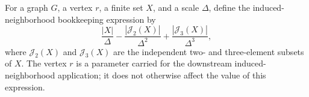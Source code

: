 \begin{definition}
For a graph $G$, a vertex $r$, a finite set $X$, and a scale $\Delta$, define
the induced-neighborhood bookkeeping expression by
\[
\frac{|X|}{\Delta}
-\frac{|\mathcal J_2(X)|}{\Delta^2}
+\frac{|\mathcal J_3(X)|}{\Delta^3},
\]
where $\mathcal J_2(X)$ and $\mathcal J_3(X)$ are the independent two- and
three-element subsets of $X$.  The vertex $r$ is a parameter carried for the
downstream induced-neighborhood application; it does not otherwise affect the
value of this expression.
\end{definition}
